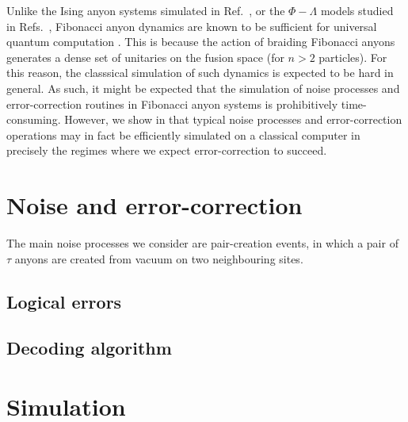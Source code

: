 \documentclass[a4paper,nofootinbib,superscriptaddress]{revtex4}
\begin{document}
	Unlike the Ising anyon systems simulated in Ref.~\cite{Brell2013}, or the $\Phi-\Lambda$ models studied in Refs.~\cite{Wootton2013,Hutter2014}, Fibonacci anyon dynamics are known to be sufficient for universal quantum computation \cite{Freedman2002}. This is because the action of braiding Fibonacci anyons generates a dense set of unitaries on the fusion space (for $n>2$ particles). For this reason, the classsical simulation of such dynamics is expected to be hard in general. As such, it might be expected that the simulation of noise processes and error-correction routines in Fibonacci anyon systems is prohibitively time-consuming. However, we show in  that typical noise processes and error-correction operations may in fact be efficiently simulated on a classical computer in precisely the regimes where we expect error-correction to succeed.
	


\section{Noise and error-correction}\label{s:noise}

	The main noise processes we consider are pair-creation events, in which a pair of $\tau$ anyons are created from vacuum on two neighbouring sites.
	

	\subsection{Logical errors}
		

	\subsection{Decoding algorithm}
	

	
	
\section{Simulation}\label{s:sim}
\end{document}
